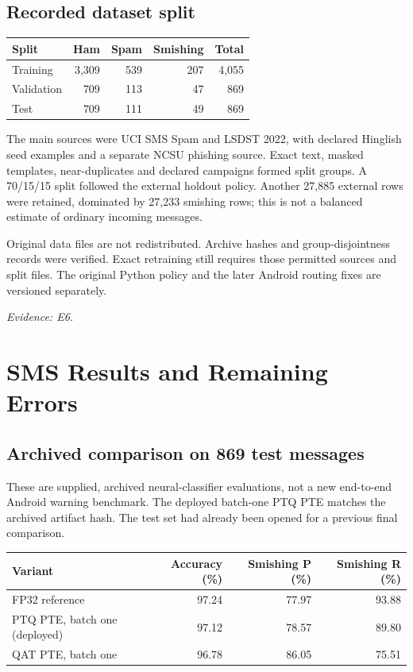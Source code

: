\documentclass[11pt,a4paper]{article}
\newcommand{\source}[1]{{\small\textit{Evidence: #1.}\par}}
\newcommand{\chapterpage}[1]{\clearpage\section{#1}}
\begin{document}
\subsection*{Recorded dataset split}
\begin{center}\small
\begin{tabular}{@{}lrrrr@{}}
\toprule Split & Ham & Spam & Smishing & Total\\\midrule
Training & 3,309 & 539 & 207 & 4,055\\
Validation & 709 & 113 & 47 & 869\\
Test & 709 & 111 & 49 & 869\\
\bottomrule
\end{tabular}
\end{center}
The main sources were UCI SMS Spam and LSDST 2022, with declared Hinglish seed examples
and a separate NCSU phishing source. Exact text, masked templates, near-duplicates and
declared campaigns formed split groups. A 70/15/15 split followed the external holdout
policy. Another 27,885 external rows were retained, dominated by 27,233 smishing rows;
this is not a balanced estimate of ordinary incoming messages.

Original data files are not redistributed. Archive hashes and group-disjointness records
were verified. Exact retraining still requires those permitted sources and split files.
The original Python policy and the later Android routing fixes are versioned separately.
\source{E6}

\chapterpage{SMS Results and Remaining Errors}
\subsection*{Archived comparison on 869 test messages}
These are supplied, archived neural-classifier evaluations, not a new end-to-end Android
warning benchmark. The deployed batch-one PTQ PTE matches the archived artifact hash.
The test set had already been opened for a previous final comparison.

\begin{center}\small
\begin{tabular}{@{}lrrr@{}}
\toprule Variant & Accuracy (\%) & Smishing P (\%) & Smishing R (\%)\\\midrule
FP32 reference & 97.24 & 77.97 & 93.88 \\
PTQ PTE, batch one (deployed) & 97.12 & 78.57 & 89.80 \\
QAT PTE, batch one & 96.78 & 86.05 & 75.51 \\
\bottomrule
\end{tabular}
\end{center}
\end{document}
